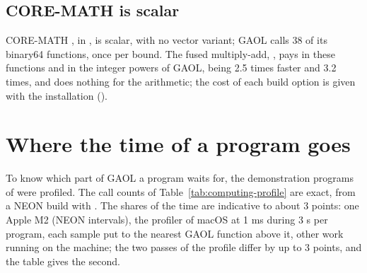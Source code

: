 \documentclass[12pt,a4paper,twoside,openright]{book}
\begin{document}
\subsection{CORE-MATH is scalar}
%

CORE-MATH \cite{CoreMath:2022}, in , is scalar, with no
vector variant; GAOL calls 38 of its binary64 functions, once per bound.
The fused multiply-add, , pays in these functions and in
the integer powers of GAOL,  being 2.5 times faster and
 3.2 times, and does nothing for the arithmetic; the cost of
each build option is given with the installation
().

\section{Where the time of a program goes}
\label{sec:where-time-goes}
%

To know which part of GAOL a program waits for, the demonstration programs of
 were profiled. The call counts of
Table~\ref{tab:computing-profile} are exact, from a NEON build with
. The shares of the time are indicative to
about 3 points: one Apple M2 (NEON intervals), the profiler  of
macOS at 1 ms during 3 s per program, each sample put to the nearest GAOL
function above it, other work running on the machine; the two passes of the
profile differ by up to 3 points, and the table gives the second.
\end{document}
